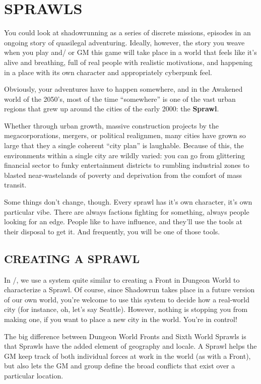 \documentclass[oneside,10pt]{article}
\begin{document}
\section{SPRAWLS}
\begin{multicols}{2}
You could look at shadowrunning as a series of discrete missions, episodes in an ongoing story of quasilegal adventuring.
Ideally, however, the story you weave when you play and/
or GM this game will take place in a world that feels like it’s
alive and breathing, full of real people with realistic motivations, and happening in a place with its own character and
appropriately cyberpunk feel.

Obviously, your adventures have to happen somewhere,
and in the Awakened world of the 2050’s, most of the time
``somewhere'' is one of the vast urban regions that grew up
around the cities of the early 2000: the \textbf{Sprawl}.

Whether through urban growth, massive construction projects
by the megacorporations, mergers, or political realignmen,
many cities have grown so large that they a single coherent
``city plan'' is laughable. Because of this, the environments
within a single city are wildly varied: you can go from glittering financial sector to funky entertainment districts to rumbling industrial zones to blasted near-wastelands of poverty
and deprivation from the comfort of mass transit.

Some things don’t change, though. Every sprawl has it’s own
character, it’s own particular vibe. There are always factions
fighting for something, always people looking for an edge.
People like to have influence, and they’ll use the tools at their
disposal to get it. And frequently, you will be one of those
tools.

\subsection{CREATING A SPRAWL}
In \SW/, we use a system quite similar to creating a
Front in Dungeon World to characterize a Sprawl. Of course,
since Shadowrun takes place in a future version of our own
world, you’re welcome to use this system to decide how a
real-world city (for instance, oh, let’s say Seattle). However,
nothing is stopping you from making one, if you want to
place a new city in the world. You’re in control!

The big difference between Dungeon World Fronts and Sixth
World Sprawls is that Sprawls have the added element of
geography and locale. A Sprawl helps the GM keep track of
both individual forces at work in the world (as with a Front),
but also lets the GM and group define the broad conflicts that
exist over a particular location.


\end{multicols}
\end{document}
